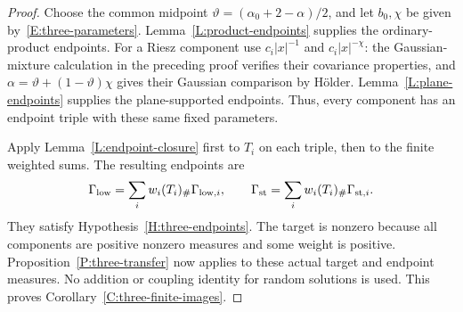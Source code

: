 \documentclass[12pt]{article}
\numberwithin{equation}{section}
\theoremstyle{definition}
\begin{document}
\begin{proof}
  Choose the common midpoint
  $\vartheta=(\alpha_0+2-\alpha)/2$, and let $b_0,\chi$ be
  given by~\eqref{E:three-parameters}.
  Lemma~\ref{L:product-endpoints} supplies the ordinary-product
  endpoints. For a Riesz component use $c_i|x|^{-1}$ and
  $c_i|x|^{-\chi}$: the Gaussian-mixture calculation in the
  preceding proof verifies their covariance properties, and
  $\alpha=\vartheta+(1-\vartheta)\chi$ gives their Gaussian
  comparison by H\"older. Lemma~\ref{L:plane-endpoints} supplies
  the plane-supported endpoints. Thus, every component has an
  endpoint triple with these same fixed parameters.

  Apply Lemma~\ref{L:endpoint-closure} first to $T_i$ on each
  triple, then to the finite weighted sums. The resulting endpoints
  are
  \[
    \Gamma_{\rm low}=\sum_iw_i(T_i)_\#\Gamma_{{\rm low},i},
    \qquad
    \Gamma_{\rm st}=\sum_iw_i(T_i)_\#\Gamma_{{\rm st},i}.
  \]
  They satisfy Hypothesis~\ref{H:three-endpoints}. The target is
  nonzero because all components are positive nonzero measures
  and some weight is positive.
  Proposition~\ref{P:three-transfer} now applies to these actual
  target and endpoint measures. No addition or coupling identity
  for random solutions is used.
  This proves Corollary~\ref{C:three-finite-images}.
\end{proof}
\end{document}
